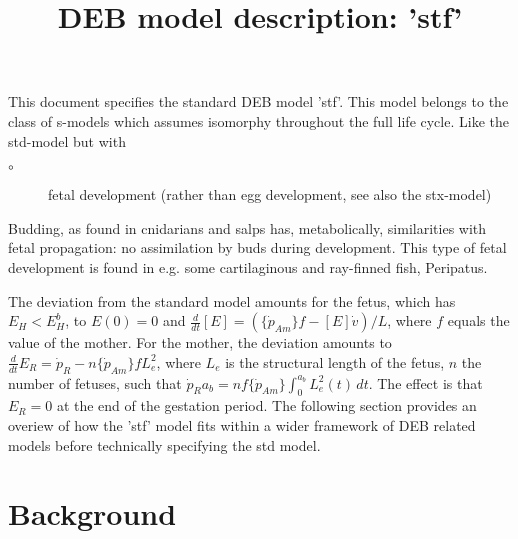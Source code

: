 \documentclass{article}
\title{DEB model description: 'stf'}
\begin{document}
\maketitle

This document specifies the standard DEB model 'stf'.
This model belongs to the class of s-models which assumes isomorphy throughout the full life cycle.
Like the std-model but with
\begin{description}
  \item[$\circ$] fetal development (rather than egg development, see also the stx-model)
\end{description}
Budding, as found in cnidarians and salps has, metabolically, similarities with fetal propagation: 
  no assimilation by buds during development.
This type of fetal development is found in e.g. some cartilaginous and ray-finned fish, Peripatus.

The deviation from the standard model amounts for the fetus, which has $E_H < E_H^b$, to 
  $E(0) = 0$ and $\frac{d} {dt} [E] = (\{\dot{p}_{Am}\} f - [E] \dot{v})/ L$, where $f$ equals the value of the mother.
For the mother, the deviation amounts to $\frac{d} {dt} E_R = \dot{p}_R - n \{\dot{p}_{Am}\} f L_e^2$, where $L_e$ is the structural length of the fetus, $n$ the number of fetuses, such that $\dot{p}_R a_b = n f \{\dot{p}_{Am}\} \int_0^{a_b} L_e^2(t) \, dt$.
The effect is that $E_R = 0$ at the end of the gestation period.
The following section provides an overiew of how the 'stf' model fits within a wider framework of DEB related models before technically specifying the std model.

\section{Background}







\end{document}
